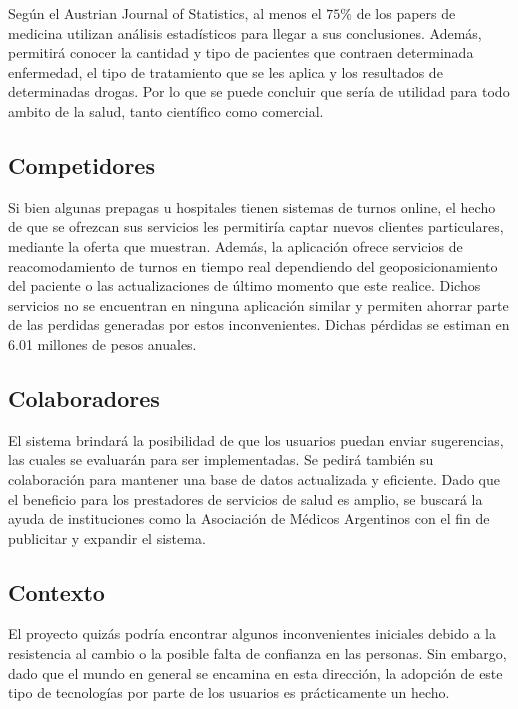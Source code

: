 \documentclass[a4paper,10pt]{article}
\begin{document}
Según el Austrian Journal of Statistics, al menos el $75\%$ de los 
papers de medicina utilizan análisis estadísticos para llegar a sus conclusiones. Además, permitirá conocer la cantidad y tipo de pacientes que contraen determinada enfermedad, el tipo de tratamiento que se les aplica y los resultados de determinadas drogas. Por lo que se puede concluir que sería de utilidad para todo ambito de la salud, tanto científico como comercial.

\subsection{Competidores}

Si bien algunas prepagas u hospitales tienen sistemas de turnos online, 
el hecho de que se ofrezcan sus servicios les permitiría captar nuevos clientes particulares, mediante la oferta que muestran. Además, la aplicación ofrece servicios de reacomodamiento de turnos en tiempo real dependiendo del geoposicionamiento del paciente o las actualizaciones de último momento que este realice. Dichos servicios no se encuentran en ninguna aplicación similar y permiten ahorrar parte de las perdidas generadas por estos inconvenientes. Dichas pérdidas se estiman en 
6.01 millones de pesos anuales.

\subsection{Colaboradores}

El sistema brindará la posibilidad de que los usuarios puedan enviar sugerencias, las cuales se evaluarán para ser implementadas. Se pedirá también su colaboración para mantener una base de datos actualizada y eficiente. 
Dado que el beneficio para los prestadores de servicios de salud es amplio, se buscará la ayuda de instituciones como la Asociación de Médicos Argentinos con el fin de publicitar y expandir el sistema.

\subsection{Contexto}

El proyecto quizás podría encontrar algunos inconvenientes iniciales debido a la resistencia al cambio o la posible falta de confianza en las personas. Sin embargo, dado que el mundo en general se encamina en esta dirección, la adopción de este  tipo de tecnologías por parte de los usuarios es prácticamente un hecho. 
\end{document}
